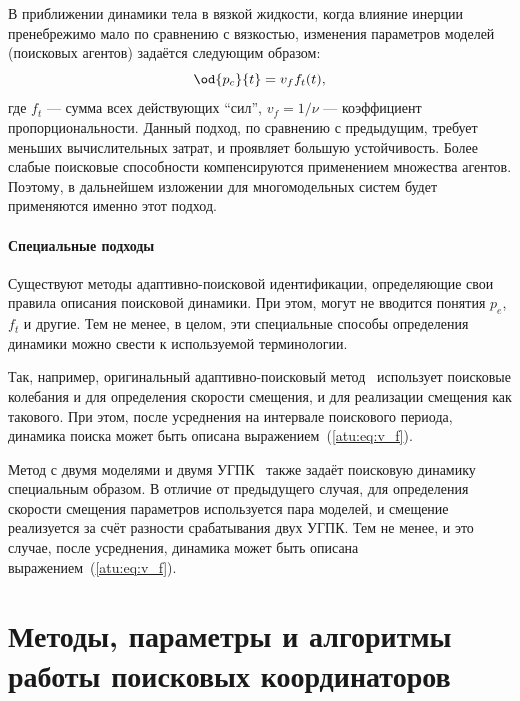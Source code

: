 В приближении динамики тела в вязкой жидкости,
когда влияние инерции пренебрежимо мало по сравнению  с вязкостью,
изменения параметров моделей (поисковых агентов) задаётся следующим образом:
%
\begin{equation}
  \od{p_c}{t} = v_f f_t(t),
  \label{atu:eq:v_f}
\end{equation}
%
\noindent
где $f_t$ --- сумма всех действующих ``сил'', $v_f = 1/\nu$ --- коэффициент
пропорциональности. Данный подход,
по сравнению с предыдущим,
требует меньших вычислительных затрат,
и проявляет большую устойчивость. Более слабые поисковые способности
компенсируются применением множества агентов. Поэтому, в дальнейшем
изложении для многомодельных систем будет применяются именно этот подход.

\paragraph{Специальные подходы}

Существуют методы адаптивно-поисковой идентификации,
определяющие свои правила описания поисковой динамики.
При этом, могут не вводится понятия $p_e$, $f_t$  и другие.
Тем не менее, в целом, эти специальные способы определения динамики
можно свести к используемой терминологии.

Так, например, оригинальный адаптивно-поисковый метод~
использует поисковые колебания и для определения скорости смещения,
и для реализации смещения как такового. При этом,
после усреднения на интервале поискового периода,
динамика поиска может быть описана выражением~(\ref{atu:eq:v_f}).

Метод с двумя моделями и двумя УГПК~
также задаёт поисковую динамику
специальным образом. В отличие от предыдущего случая,
для определения скорости смещения параметров используется пара
моделей, и смещение реализуется за счёт разности срабатывания двух УГПК.
Тем не менее, и это случае, после усреднения, динамика
может быть описана выражением~(\ref{atu:eq:v_f}).












\section{Методы, параметры и алгоритмы работы поисковых координаторов}  %

